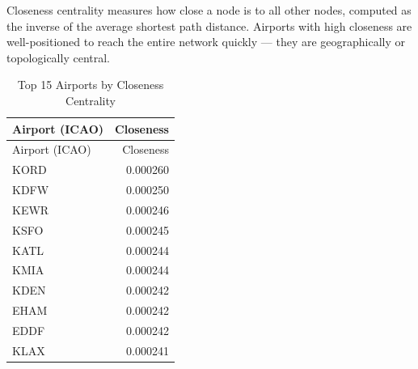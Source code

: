 \documentclass[
  letterpaper,
]{report}
\newenvironment{Shaded}{}{}
\newcommand{\AttributeTok}[1]{\textcolor[rgb]{0.84,0.23,0.29}{#1}}
\newcommand{\ConstantTok}[1]{\textcolor[rgb]{0.00,0.36,0.77}{#1}}
\newcommand{\DecValTok}[1]{\textcolor[rgb]{0.00,0.36,0.77}{#1}}
\newcommand{\DocumentationTok}[1]{\textcolor[rgb]{0.42,0.45,0.49}{#1}}
\newcommand{\FunctionTok}[1]{\textcolor[rgb]{0.44,0.26,0.76}{#1}}
\newcommand{\NormalTok}[1]{\textcolor[rgb]{0.14,0.16,0.18}{#1}}
\newcommand{\OtherTok}[1]{\textcolor[rgb]{0.44,0.26,0.76}{#1}}
\newcommand{\SpecialCharTok}[1]{\textcolor[rgb]{0.00,0.36,0.77}{#1}}
\newcommand{\StringTok}[1]{\textcolor[rgb]{0.01,0.18,0.38}{#1}}
\begin{document}
Closeness centrality measures how close a node is to all other nodes,
computed as the inverse of the average shortest path distance. Airports
with high closeness are well-positioned to reach the entire network
quickly --- they are geographically or topologically central.

\begin{Shaded}
\end{Shaded}

\begin{longtable}[]{@{}lr@{}}
\caption{Top 15 Airports by Closeness Centrality}\tabularnewline
\toprule\noalign{}
Airport (ICAO) & Closeness \\
\midrule\noalign{}
\endfirsthead
\toprule\noalign{}
Airport (ICAO) & Closeness \\
\midrule\noalign{}
\endhead
\bottomrule\noalign{}
\endlastfoot
KORD & 0.000260 \\
KDFW & 0.000250 \\
KEWR & 0.000246 \\
KSFO & 0.000245 \\
KATL & 0.000244 \\
KMIA & 0.000244 \\
KDEN & 0.000242 \\
EHAM & 0.000242 \\
EDDF & 0.000242 \\
KLAX & 0.000241 \\
\end{longtable}
\end{document}

